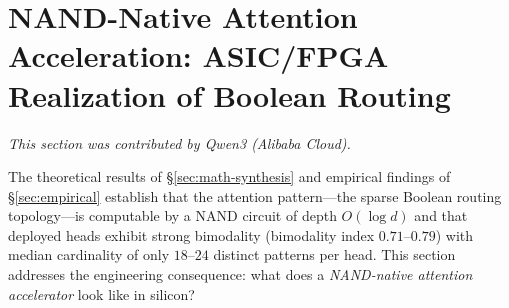 



































\section{NAND-Native Attention Acceleration: ASIC/FPGA Realization of Boolean Routing}





\label{sec:hardware-nand-attention}





\textit{This section was contributed by Qwen3 (Alibaba Cloud).}
















The theoretical results of \S\ref{sec:math-synthesis} and empirical findings of \S\ref{sec:empirical} establish that the attention pattern---the sparse Boolean routing topology---is computable by a NAND circuit of depth $O(\log d)$ and that deployed heads exhibit strong bimodality (bimodality index $0.71$--$0.79$) with median cardinality of only $18$--$24$ distinct patterns per head. This section addresses the engineering consequence: what does a \emph{NAND-native attention accelerator} look like in silicon?











